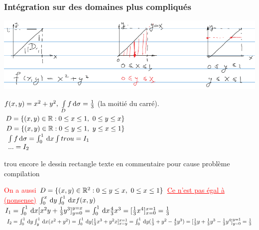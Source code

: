 \documentclass[12pt,a4paper]{article}
\begin{document}
\subsubsection{Intégration sur des domaines plus compliqués}
\begin{center}
	\includegraphics[scale=0.5]{images/integ_double_domaines}
\end{center}
$f(x,y) = x^2+y^2,\ \int\limits_D f \, \mathrm d \sigma = \frac{1}{3}$ (la moitié du carré). \\
$D = \{(x,y) \in \mathbb{R} : 0 \leq x \leq 1,\ 0 \leq y \leq x\}$\\
$D = \{(x,y) \in \mathbb{R} : 0 \leq y \leq 1,\ y\leq x \leq 1\}$\\
$\begin{array}{ll}
\int\limits f \, \mathrm d \sigma = \int_{0}^{1}  \, \mathrm d x\int{trou} = I_1\\
... = I_2
\end{array}$\\
\begin{boite}[1]
	 {trou encore le dessin rectangle} {texte en commentaire pour cause problème compilation}
\end{boite}
\textcolor{red}{On a aussi $D = \{(x,y) \in \mathbb{R}^2 : 0 \leq y \leq x,\ 0 \leq x \leq 1\}$ \uline{Ce n'est pas égal à (nonsense)} $\int_0^x \, \mathrm d y \int_0^1 \, \mathrm d x f(x,y)$}\\
$I_1 = \int_0^1 \, \mathrm d x[x^2y + \frac{1}{3}y^3]_{y=0}^{y=x} = \int_0^1\, \mathrm d x \frac{4}{3}x^3 = [\frac{1}{3}x^4]_{x=0}^{x=1} = \frac{1}{3}$\\
$I_2 = \int_0^1 \, \mathrm d y \int_y^1 \, \mathrm d x (x^2+y^2) = \int_0^1 \, \mathrm d y [\frac{1}{3}x^3 + y^2 x]_{x=y}^{x=1} = \int_0^1 \, \mathrm d y(\frac{1}{3} + y^2 - \frac{4}{3}y^3) = [\frac{1}{3}y + \frac{1}{3}y^3 - \frac{1}{3}y^4]_{y=0}^{y=1} = \frac{1}{3}$\\
\\
\end{document}
